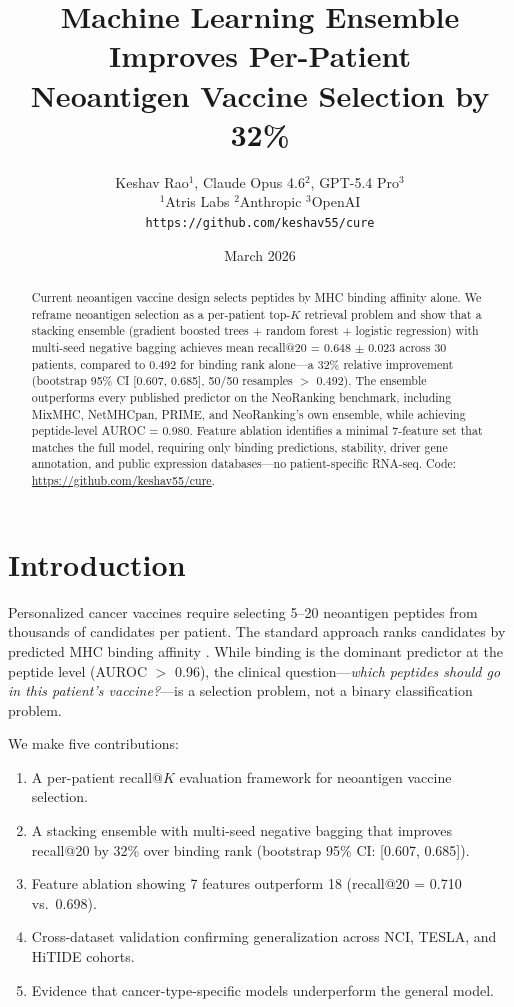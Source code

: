 \documentclass[11pt,twocolumn]{article}
\title{\textbf{Machine Learning Ensemble Improves Per-Patient\\Neoantigen Vaccine Selection by 32\%}}
\author{Keshav Rao$^{1}$, Claude Opus 4.6$^{2}$, GPT-5.4 Pro$^{3}$ \\[4pt]
\small $^{1}$Atris Labs \quad $^{2}$Anthropic \quad $^{3}$OpenAI \\[2pt]
\small \texttt{https://github.com/keshav55/cure}}
\date{March 2026}
\begin{document}
\maketitle

\begin{abstract}
Current neoantigen vaccine design selects peptides by MHC binding affinity alone. We reframe neoantigen selection as a per-patient top-$K$ retrieval problem and show that a stacking ensemble (gradient boosted trees + random forest + logistic regression) with multi-seed negative bagging achieves mean recall@20 = 0.648 $\pm$ 0.023 across 30 patients, compared to 0.492 for binding rank alone---a 32\% relative improvement (bootstrap 95\% CI [0.607, 0.685], 50/50 resamples $>$ 0.492). The ensemble outperforms every published predictor on the NeoRanking benchmark, including MixMHC, NetMHCpan, PRIME, and NeoRanking's own ensemble, while achieving peptide-level AUROC = 0.980. Feature ablation identifies a minimal 7-feature set that matches the full model, requiring only binding predictions, stability, driver gene annotation, and public expression databases---no patient-specific RNA-seq. Code: \url{https://github.com/keshav55/cure}.
\end{abstract}

\section{Introduction}

Personalized cancer vaccines require selecting 5--20 neoantigen peptides from thousands of candidates per patient. The standard approach ranks candidates by predicted MHC binding affinity \cite{muller2023neoranking}. While binding is the dominant predictor at the peptide level (AUROC $>$ 0.96), the clinical question---\textit{which peptides should go in this patient's vaccine?}---is a selection problem, not a binary classification problem.

We make five contributions:

\begin{enumerate}[leftmargin=*,topsep=0pt,itemsep=2pt]
\item A per-patient recall@$K$ evaluation framework for neoantigen vaccine selection.
\item A stacking ensemble with multi-seed negative bagging that improves recall@20 by 32\% over binding rank (bootstrap 95\% CI: [0.607, 0.685]).
\item Feature ablation showing 7 features outperform 18 (recall@20 = 0.710 vs.\ 0.698).
\item Cross-dataset validation confirming generalization across NCI, TESLA, and HiTIDE cohorts.
\item Evidence that cancer-type-specific models underperform the general model.
\end{enumerate}
\end{document}
